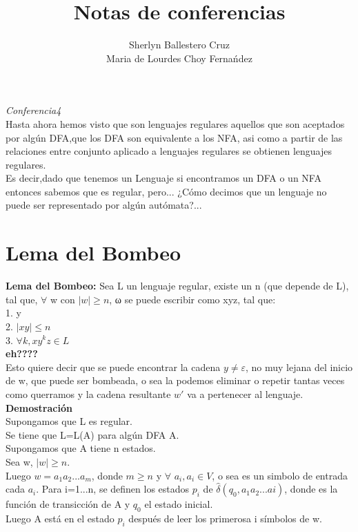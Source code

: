 \documentclass[12pt,a4paper]{article}
\title{Notas de conferencias}
\author{Sherlyn Ballestero Cruz \\ Maria de Lourdes Choy Ferna\'ndez}
\begin{document}
\maketitle
\newpage
\pagestyle{myheadings}
\textit{Conferencia4}\\
 Hasta ahora hemos visto que son lenguajes regulares aquellos que son aceptados por alg\'un DFA,que los DFA son equivalente a los NFA, asi como a partir de las relaciones entre conjunto aplicado a lenguajes regulares se obtienen lenguajes regulares.\\
 Es decir,dado que tenemos un Lenguaje si encontramos un DFA o un NFA entonces sabemos que es regular, pero... ¿C\'omo decimos que un lenguaje no puede ser representado por alg\'un aut\'omata?...\\
\section{Lema del Bombeo}
\textbf{Lema del Bombeo:}
Sea L un lenguaje regular, existe un n (que depende de L), tal que,
$\forall$ w con  $\vert w \vert \geqslant n$, ω se puede escribir como
xyz, tal que:\\
1. y \neq \varepsilon\\
2. $\vert xy \vert\leqslant n$\\
3. $\forall k, xy^{k}z \in L$\\
\textbf{eh????}\\
Esto quiere decir que se puede encontrar la cadena  
$y \neq \varepsilon$, no muy lejana del inicio de w, que puede ser bombeada, o sea la podemos eliminar o repetir tantas veces como querramos y la cadena resultante $w'$ va a pertenecer al lenguaje.\\
\textbf{Demostraci\'on}\\
Supongamos que L es regular.\\
Se tiene que L=L(A) para alg\'un DFA A.\\
Supongamos que A tiene n estados.\\
Sea w,  $\vert w \vert \geqslant n$.\\
Luego $w=a_{1}a_{2}...a_{m}$, donde $m\geqslant n$ y $ \forall$ $a_{i}, a_{i}\in V$, o sea es un simbolo de entrada cada $a_{i}$.
Para i=1...n, se definen los estados $p_{i}$ de $\widehat{\delta}(q_{0},a_{1}a_{2}...a{i})$, donde \delta es la funci\'on de transicci\'on de A y $q_{0}$ el estado inicial.\\
Luego A est\'a en el estado $p_{i}$ despu\'es de leer los primerosa i s\'imbolos de w.\\
\end{document}
